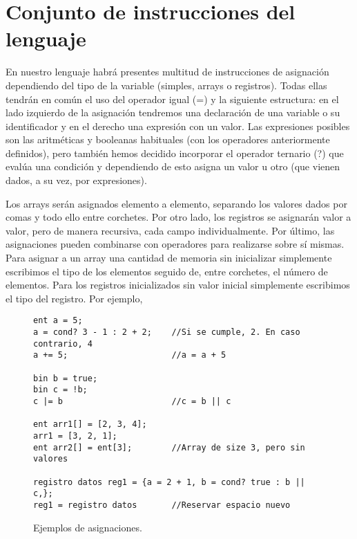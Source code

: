\section*{Conjunto de instrucciones del lenguaje}
En nuestro lenguaje habrá presentes multitud de instrucciones de asignación
dependiendo del tipo de la variable (simples, arrays o registros). Todas ellas
tendrán en común el uso del operador igual (=) y la siguiente estructura: en el
lado izquierdo de la asignación tendremos una declaración de una variable o su
identificador y en el derecho una expresión con un valor. Las expresiones
posibles son las aritméticas y booleanas habituales (con los operadores
anteriormente definidos), pero también hemos decidido incorporar el operador
ternario (?) que evalúa una condición y dependiendo de esto asigna un valor u
otro (que vienen dados, a su vez, por expresiones). 

Los arrays serán asignados elemento a elemento, separando los valores dados por
comas y todo ello entre corchetes. Por otro lado, los registros se asignarán
valor a valor, pero de manera recursiva, cada campo individualmente. Por último,
las asignaciones pueden combinarse con operadores para realizarse sobre sí
mismas. Para asignar a un array una cantidad de memoria sin inicializar
simplemente escribimos el tipo de los elementos seguido de, entre corchetes, el
número de elementos. Para los registros inicializados sin valor inicial
simplemente escribimos el tipo del registro. Por ejemplo,
\begin{figure}[H]
    \centering
    \begin{lstlisting}
ent a = 5;
a = cond? 3 - 1 : 2 + 2;    //Si se cumple, 2. En caso contrario, 4
a += 5;                     //a = a + 5

bin b = true;
bin c = !b;
c |= b                      //c = b || c

ent arr1[] = [2, 3, 4];
arr1 = [3, 2, 1];
ent arr2[] = ent[3];        //Array de size 3, pero sin valores

registro datos reg1 = {a = 2 + 1, b = cond? true : b || c,};
reg1 = registro datos       //Reservar espacio nuevo
    \end{lstlisting}
    \caption{Ejemplos de asignaciones.}
\end{figure}

